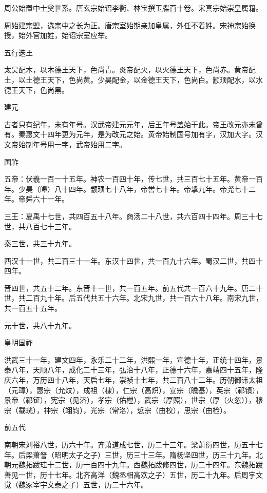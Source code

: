 \documentclass[a4paper,12pt,UTF8,twoside]{ctexbook}
\begin{document}
    周公始置中士奠世系。唐玄宗始诏李衢、林宝撰玉牒百十卷。宋真宗始崇皇属籍。
    
    周始建宗盟，选宗中之长为正。唐宗室始期亲加皇属，外任不着姓。宋神宗始换授，始外官加姓，始诏宗室应举。
    
    五行迭王
    
    太昊配木，以木德王天下，色尚青。炎帝配火，以火德王天下，色尚赤。黄帝配土，以土德王天下，色尚黄。少昊配金，以金德王天下，色尚白。颛顼配水，以水德王天下，色尚黑。
    
    建元
    
    古者只有纪年，未有年号。汉武帝建元元年，后王年号盖始于此。帝王改元亦未曾有。秦惠文十四年更为元年，是为改元之始。黄帝始制国号加有字，汉加大字。汉文帝始制年号用一字，武帝始用二字。
    
    国祚
    
    五帝：伏羲一百一十五年。神农一百四十年，传七世，共三百七十五年。黄帝一百年。少昊（皞）八十四年。颛顼七十八年，帝喾七十年。帝挚九年。帝尧七十二年。帝舜六十一年。
    
    三王：夏禹十七世，共四百五十八年。商汤二十八世，共六百四十四年。周三十七世，共八百七十三年。
    
    秦三世，共三十九年。
    
    西汉十一世，共二百三十一年。东汉十四世，共一百九十六年。蜀汉二世，共四十四年。
    
    晋四世，共五十二年。东晋十一世，共一百五年。前五代共一百六十九年。唐二十世，共二百九十年。后五代共五十六年。北宋九世，共一百六十八年。南宋九世，共一百五十五年。
    
    元十世，共八十九年。
    
    皇明国祚
    
    洪武三十一年，建文四年，永乐二十二年，洪熙一年，宣德十年，正统十四年，景泰八年，天顺八年，成化二十三年，弘治十八年，正德十六年，嘉靖四十五年，隆庆六年，万历四十八年，天启七年，崇祯十七年，共二百八十二年。历朝御讳太祖（元璋），惠宗（允炆），成祖（棣），仁宗（高炽），宣宗（瞻基），英宗（祁镇），景帝（祁钲），宪宗（见济），孝宗（佑樘），武宗（厚照），世宗（厚（火忽）），穆宗（载珖），神宗（翊钧），光宗（常洛），悊宗（由校），思宗（由检）。
    
    前五代
    
    南朝宋刘裕八世，历六十年。齐萧道成七世，历二十三年。梁萧衍四世，历五十七年。后梁萧詧（昭明太子之子）三世，历三十三年。隋杨坚四世，历三十九年。北朝元魏拓跋珪十二世，历一百四十九年。西魏拓跋修四世，历二十四年。东魏拓跋善见一世，历十七年。北齐高洋（魏丞相高欢之子）五世，历二十九年。后周宇文觉（魏冢宰宇文泰之子）五世，历二十六年。
    
\end{document}
